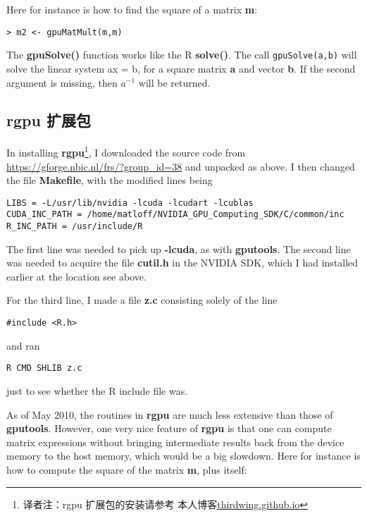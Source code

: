 Here for instance is how to find the square of a matrix {\bf m}:

\begin{lstlisting}
> m2 <- gpuMatMult(m,m)
\end{lstlisting}

The {\bf gpuSolve()} function works like the R {\bf solve()}.  The call
\lstinline{gpuSolve(a,b)} will solve the linear system ax = b, for a
square matrix {\bf a} and vector {\bf b}.  If the second argument is
missing, then $a^{-1}$ will be returned.

\subsection{rgpu 扩展包}
\label{rgpu}

In installing {\bf rgpu}\footnote{译者注：rgpu 扩展包的安装请参考
本人博客\url{thirdwing.github.io}}, I downloaded the source code from
\url{https://gforge.nbic.nl/frs/?group_id=38} and unpacked as above.
I then changed the file {\bf Makefile}, with the modified lines being

\begin{lstlisting}
LIBS = -L/usr/lib/nvidia -lcuda -lcudart -lcublas
CUDA_INC_PATH = /home/matloff/NVIDIA_GPU_Computing_SDK/C/common/inc
R_INC_PATH = /usr/include/R
\end{lstlisting}

The first line was needed to pick up {\bf -lcuda}, as with {\bf
gputools}.  The second line was needed to acquire the file {\bf cutil.h}
in the NVIDIA SDK, which I had installed earlier at the location see
above.

For the third line, I made a file {\bf z.c} consisting solely of the
line

\begin{lstlisting}
#include <R.h>
\end{lstlisting}

and ran

\begin{lstlisting}
R CMD SHLIB z.c
\end{lstlisting}

just to see whether the R include file was.

As of May 2010, the routines in {\bf rgpu} are much less extensive than
those of {\bf gputools}.  However, one very nice feature of {\bf rgpu}
is that one can compute matrix expressions without bringing intermediate
results back from the device memory to the host memory, which would be a
big slowdown.  Here for instance is how to compute the square of the
matrix {\bf m}, plus itself:

